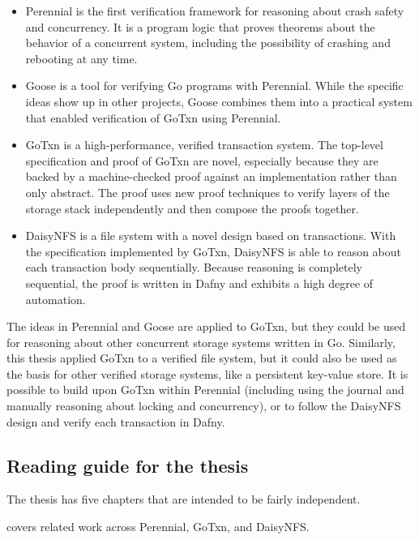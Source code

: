 \begin{itemize}
  \item Perennial is the first verification framework for reasoning about crash
        safety and concurrency. It is a program logic that proves theorems about
        the behavior of a concurrent system, including the possibility of
        crashing and rebooting at any time.
  \item Goose is a tool for verifying Go programs with Perennial. While the
        specific ideas show up in other projects, Goose combines them into a
        practical system that enabled verification of GoTxn using Perennial.
  \item GoTxn is a high-performance, verified transaction system. The
        top-level specification and proof of GoTxn are novel, especially because
        they are backed by a machine-checked proof against an implementation
        rather than only abstract. The proof uses new proof techniques to
        verify layers of the storage stack independently and then compose the
        proofs together.
  \item DaisyNFS is a file system with a novel design based on transactions.
        With the specification implemented by GoTxn, DaisyNFS is able to reason
        about each transaction body sequentially. Because reasoning is
        completely sequential, the proof is written in Dafny and exhibits a high
        degree of automation.
\end{itemize}

The ideas in Perennial and Goose are applied to GoTxn, but they could be used
for reasoning about other concurrent storage systems written in Go. Similarly,
this thesis applied GoTxn to a verified file system, but it could also be used
as the basis for other verified storage systems, like a persistent key-value
store. It is possible to build upon GoTxn within Perennial (including using the
journal and manually reasoning about locking and concurrency), or to follow the
DaisyNFS design and verify each transaction in Dafny.

\subsection{Reading guide for the thesis}

The thesis has five chapters that are intended to be fairly independent.

 covers related work across Perennial, GoTxn, and DaisyNFS.

